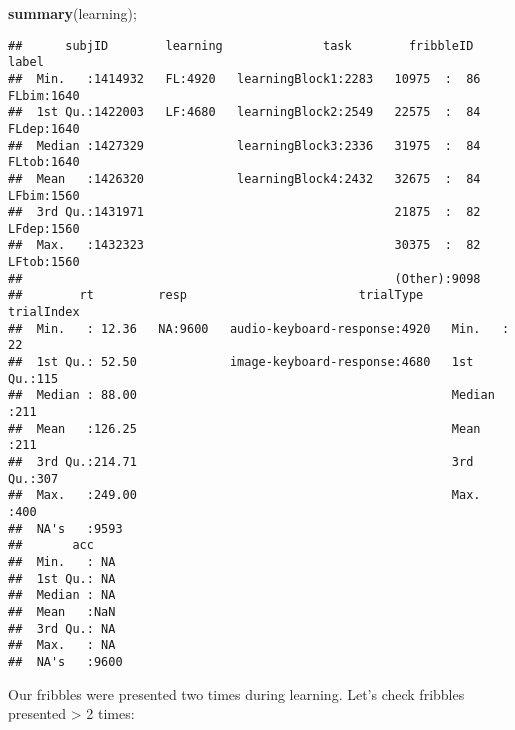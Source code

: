 \documentclass[
]{article}
\newenvironment{Shaded}{\begin{snugshade}}{\end{snugshade}}
\newcommand{\DecValTok}[1]{\textcolor[rgb]{0.00,0.00,0.81}{#1}}
\newcommand{\KeywordTok}[1]{\textcolor[rgb]{0.13,0.29,0.53}{\textbf{#1}}}
\newcommand{\NormalTok}[1]{#1}
\newcommand{\OperatorTok}[1]{\textcolor[rgb]{0.81,0.36,0.00}{\textbf{#1}}}
\newcommand{\StringTok}[1]{\textcolor[rgb]{0.31,0.60,0.02}{#1}}
\begin{document}
\begin{Shaded}
\begin{Highlighting}[]
\KeywordTok{summary}\NormalTok{(learning);}
\end{Highlighting}
\end{Shaded}

\begin{verbatim}
##      subjID        learning              task        fribbleID      label     
##  Min.   :1414932   FL:4920   learningBlock1:2283   10975  :  86   FLbim:1640  
##  1st Qu.:1422003   LF:4680   learningBlock2:2549   22575  :  84   FLdep:1640  
##  Median :1427329             learningBlock3:2336   31975  :  84   FLtob:1640  
##  Mean   :1426320             learningBlock4:2432   32675  :  84   LFbim:1560  
##  3rd Qu.:1431971                                   21875  :  82   LFdep:1560  
##  Max.   :1432323                                   30375  :  82   LFtob:1560  
##                                                    (Other):9098               
##        rt         resp                        trialType      trialIndex 
##  Min.   : 12.36   NA:9600   audio-keyboard-response:4920   Min.   : 22  
##  1st Qu.: 52.50             image-keyboard-response:4680   1st Qu.:115  
##  Median : 88.00                                            Median :211  
##  Mean   :126.25                                            Mean   :211  
##  3rd Qu.:214.71                                            3rd Qu.:307  
##  Max.   :249.00                                            Max.   :400  
##  NA's   :9593                                                           
##       acc      
##  Min.   : NA   
##  1st Qu.: NA   
##  Median : NA   
##  Mean   :NaN   
##  3rd Qu.: NA   
##  Max.   : NA   
##  NA's   :9600
\end{verbatim}

Our fribbles were presented two times during learning. Let's check
fribbles presented \textgreater{} 2 times:

\begin{Shaded}
\end{Shaded}
\end{document}

